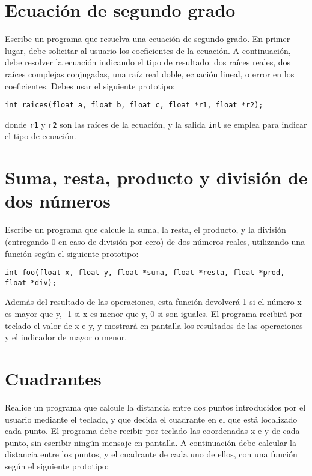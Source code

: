 \documentclass[a4paper]{article}
\begin{document}
\section{Ecuación de segundo grado}
\label{sec:org28a5534}

Escribe un programa que resuelva una ecuación de segundo grado. En primer lugar, debe solicitar al usuario los coeficientes de la ecuación. A continuación, debe resolver la ecuación indicando el tipo de resultado: dos raíces reales, dos raíces complejas conjugadas, una raíz real doble, ecuación lineal, o error en los coeficientes. Debes usar el siguiente prototipo:

\lstset{language=C,label= ,caption= ,captionpos=b,numbers=none}
\begin{lstlisting}
int raices(float a, float b, float c, float *r1, float *r2);
\end{lstlisting}

donde \texttt{r1} y \texttt{r2} son las raíces de la ecuación, y la salida \texttt{int} se emplea para indicar el tipo de ecuación.

\section{Suma, resta, producto y división de dos números}
\label{sec:org5360d01}
Escribe un programa que calcule la suma, la resta, el producto, y la división (entregando 0 en caso de división por cero) de dos números reales, utilizando una función según el siguiente prototipo:

\lstset{language=C,label= ,caption= ,captionpos=b,numbers=none}
\begin{lstlisting}
int foo(float x, float y, float *suma, float *resta, float *prod, float *div);
\end{lstlisting}
Además del resultado de las operaciones, esta función devolverá 1 si el número x es mayor que y, -1 si x es menor que y, 0 si son iguales.
El programa recibirá por teclado el valor de x e y, y mostrará en pantalla los resultados de las operaciones y el indicador de mayor o menor.


\section{Cuadrantes}
\label{sec:org7fedbe3}
Realice un programa que calcule la distancia entre dos puntos introducidos por el usuario mediante el teclado, y que decida el cuadrante en el que está localizado cada punto. El programa debe recibir por teclado las coordenadas x e y de cada punto, sin escribir ningún mensaje en pantalla. A continuación debe calcular la distancia entre los puntos, y el cuadrante de cada uno de ellos, con una función según el siguiente prototipo:
\end{document}
